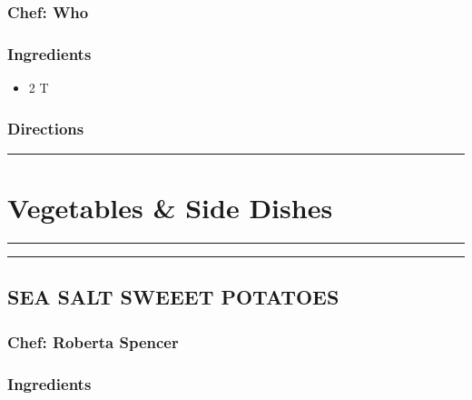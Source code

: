 \documentclass[
]{book}
\providecommand{\tightlist}{%
  \setlength{\itemsep}{0pt}\setlength{\parskip}{0pt}}
\begin{document}
\hypertarget{chef-who}{%
\subsection*{Chef: Who}\label{chef-who}}


\hypertarget{ingredients-25}{%
\subsection*{Ingredients}\label{ingredients-25}}


\begin{itemize}
\tightlist
\item
  2 T
\end{itemize}

\hypertarget{directions-25}{%
\subsection*{Directions}\label{directions-25}}


\begin{center}\rule{0.5\linewidth}{0.5pt}\end{center}

\hypertarget{Sides}{%
\chapter{Vegetables \& Side Dishes}\label{Sides}}

\begin{center}\rule{0.5\linewidth}{0.5pt}\end{center}

\begin{center}\rule{0.5\linewidth}{0.5pt}\end{center}

\hypertarget{sea-salt-sweeet-potatoes}{%
\section*{SEA SALT SWEEET POTATOES}\label{sea-salt-sweeet-potatoes}}


\hypertarget{chef-roberta-spencer-5}{%
\subsection*{Chef: Roberta Spencer}\label{chef-roberta-spencer-5}}


\hypertarget{ingredients-26}{%
\subsection*{Ingredients}\label{ingredients-26}}
\end{document}
